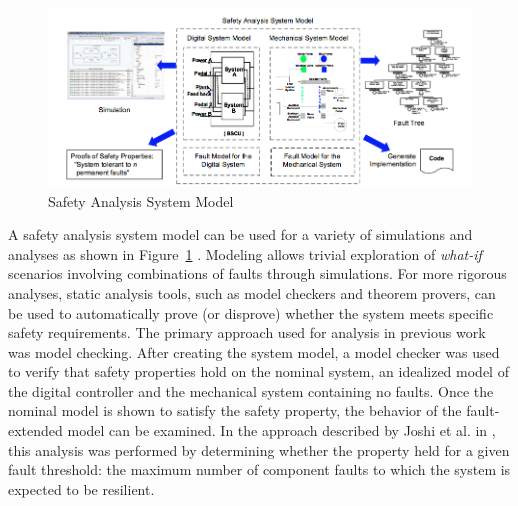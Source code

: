 
\begin{figure}
  \centering
 \includegraphics[width=1\textwidth]{images/SASM.png}
  \vspace{-0.1in}
  \caption{Safety Analysis System Model}
  \label{fig:sasm}
\end{figure}

A safety analysis system model can be used for a variety of simulations and analyses as shown in Figure~\ref{fig:sasm}  . Modeling allows trivial exploration of \textit{what-if} scenarios involving combinations of faults through simulations. For more rigorous analyses, static analysis tools, such as model checkers and theorem provers, can be used to automatically prove (or disprove) whether the system meets specific safety requirements.
The primary approach used for analysis in previous work was model checking. After creating the system model, a model checker was used to verify that safety properties hold on the nominal system, an idealized model of the digital controller and the mechanical system containing no faults. Once the nominal model is shown to satisfy the safety property, the behavior of the fault-extended model can be examined. In the approach described by Joshi et al. in \cite{Joshi05:Dasc, Joshi05:SafeComp, Joshi07:Hase}, this analysis was performed by determining whether the property held for a given fault threshold: the maximum number of component faults to which the system is expected to be resilient.

